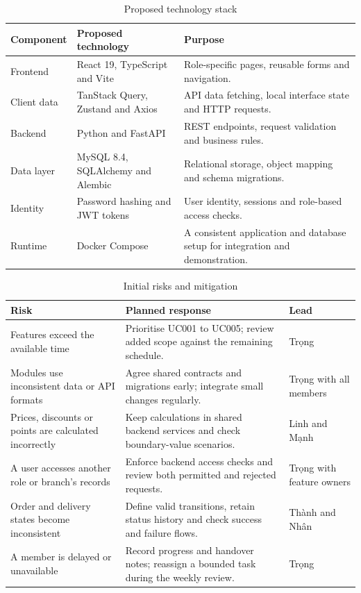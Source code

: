 \begin{table}[H]
  \centering
  \caption{Proposed technology stack}
  \label{tab:tech-stack}
  \begin{tabularx}{\textwidth}{|L{2.4cm}|L{5.0cm}|Y|}
    \hline
    \textbf{Component} & \textbf{Proposed technology} & \textbf{Purpose} \\ \hline
    Frontend & React 19, TypeScript and Vite & Role-specific pages, reusable forms and navigation. \\ \hline
    Client data & TanStack Query, Zustand and Axios & API data fetching, local interface state and HTTP requests. \\ \hline
    Backend & Python and FastAPI & REST endpoints, request validation and business rules. \\ \hline
    Data layer & MySQL 8.4, SQLAlchemy and Alembic & Relational storage, object mapping and schema migrations. \\ \hline
    Identity & Password hashing and JWT tokens & User identity, sessions and role-based access checks. \\ \hline
    Runtime & Docker Compose & A consistent application and database setup for integration and demonstration. \\ \hline
  \end{tabularx}
\end{table}

\begin{table}[H]
  \centering
  \caption{Initial risks and mitigation}
  \label{tab:risks}
  \begin{tabularx}{\textwidth}{|L{4.2cm}|Y|L{2.6cm}|}
    \hline
    \textbf{Risk} & \textbf{Planned response} & \textbf{Lead} \\ \hline
    Features exceed the available time & Prioritise UC001 to UC005; review added scope against the remaining schedule. & Trọng \\ \hline
    Modules use inconsistent data or API formats & Agree shared contracts and migrations early; integrate small changes regularly. & Trọng with all members \\ \hline
    Prices, discounts or points are calculated incorrectly & Keep calculations in shared backend services and check boundary-value scenarios. & Linh and Mạnh \\ \hline
    A user accesses another role or branch's records & Enforce backend access checks and review both permitted and rejected requests. & Trọng with feature owners \\ \hline
    Order and delivery states become inconsistent & Define valid transitions, retain status history and check success and failure flows. & Thành and Nhân \\ \hline
    A member is delayed or unavailable & Record progress and handover notes; reassign a bounded task during the weekly review. & Trọng \\ \hline
  \end{tabularx}
\end{table}

